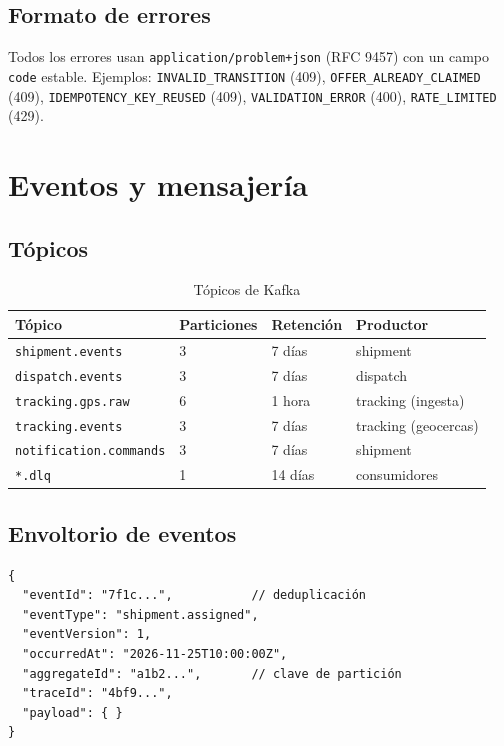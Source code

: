 \documentclass[10pt,letterpaper,twocolumn,oneside]{report}
\newcommand{\pkg}[1]{\texttt{#1}}
\begin{document}
\section{Formato de errores}

Todos los errores usan \pkg{application/problem+json} (RFC 9457) con un campo \pkg{code}
estable. Ejemplos: \pkg{INVALID\_TRANSITION} (409), \pkg{OFFER\_ALREADY\_CLAIMED} (409),
\pkg{IDEMPOTENCY\_KEY\_REUSED} (409), \pkg{VALIDATION\_ERROR} (400), \pkg{RATE\_LIMITED} (429).

\twocolumn
\chapter{Eventos y mensajería}

\section{Tópicos}

\begin{table}[t]
\centering
\caption{Tópicos de Kafka}
\small
\begin{tabular}{@{}L{5cm}L{2.2cm}L{2.4cm}L{5.2cm}@{}}
\toprule
\textbf{Tópico} & \textbf{Particiones} & \textbf{Retención} & \textbf{Productor}\\
\midrule
\pkg{shipment.events} & 3 & 7 días & shipment\\
\pkg{dispatch.events} & 3 & 7 días & dispatch\\
\pkg{tracking.gps.raw} & 6 & 1 hora & tracking (ingesta)\\
\pkg{tracking.events} & 3 & 7 días & tracking (geocercas)\\
\pkg{notification.commands} & 3 & 7 días & shipment\\
\pkg{*.dlq} & 1 & 14 días & consumidores\\
\bottomrule
\end{tabular}
\end{table}

\section{Envoltorio de eventos}

\begin{verbatim}
{
  "eventId": "7f1c...",           // deduplicación
  "eventType": "shipment.assigned",
  "eventVersion": 1,
  "occurredAt": "2026-11-25T10:00:00Z",
  "aggregateId": "a1b2...",       // clave de partición
  "traceId": "4bf9...",
  "payload": { }
}
\end{verbatim}
\end{document}
